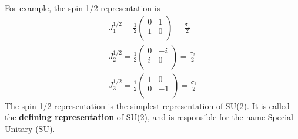 For example, the spin 1/2 representation is
\begin{equation}
    \begin{aligned}
        J^{1/2}_1 = \frac{1}{2}
    \begin{pmatrix}
        0 & 1 \\ 
        1 & 0 \\ 
    \end{pmatrix} = \frac{\sigma_1}{2}\\
    J^{1/2}_2 = \frac{1}{2}
    \begin{pmatrix}
        0 & -i \\ 
        i & 0 \\ 
    \end{pmatrix} = \frac{\sigma_2}{2}\\
    J^{1/2}_3 = \frac{1}{2}
    \begin{pmatrix}
        1 & 0 \\ 
        0 & -1 \\ 
    \end{pmatrix} = \frac{\sigma_3}{2}
    \end{aligned}
\end{equation}
The spin 1/2 representation is the simplest representation of SU(2). 
It is called the \textbf{defining representation} of SU(2), and is responsible for the name Special Unitary (SU).

\newpage
